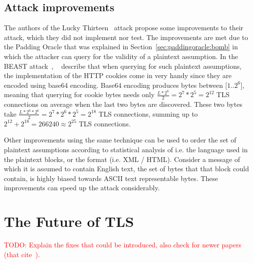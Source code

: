 \documentclass[10pt,conference,a4paper]{IEEEtran}
\begin{document}
\subsection{Attack improvements}
\label{sec:lucky:improvements}
The authors of the Lucky Thirteen~\cite{alfardan2013lucky} attack propose some improvements to their attack, which they did not implement nor test. The improvements are met due to the Padding Oracle that was explained in Section~\ref{sec:paddingoracle:bomb} in which the attacker can query for the validity of a plaintext assumption. In the BEAST attack~\cite{duong2011here}, ~\citeauthor{duong2011here} describe that when querying for such plaintext assumptions, the implementation of the HTTP cookies come in very handy since they are encoded using base64 encoding. Base64 encoding produces bytes between [$1..2^6$], meaning that querying for cookie bytes needs only $\frac{L*2^{6}}{2} = 2^7 * 2^5 = 2^{12}$ TLS connections on average when the last two bytes are discovered. These two bytes take $\frac{L*2^6*2^6}{2} = 2^7*2^6*2^5 = 2^{18}$ TLS connections, summing up to $2^{12} + 2^{18} = 266240 \approx 2^{25}$ TLS connections.

Other improvements using the same technique can be used to order the set of plaintext assumptions according to statistical analysis of i.e. the language used in the plaintext blocks, or the format (i.e. XML / HTML). Consider a message of which it is assumed to contain English text, the set of bytes that that block could contain, is highly biased towards ASCII text representable bytes. These improvements can speed up the attack considerably.




\section{The Future of TLS}
\label{sec:future}
\textcolor{red}{TODO: Explain the fixes that could be introduced, also check for newer papers (that  cite~\citeauthor{alfardan2013lucky}).}



%

\end{document}
